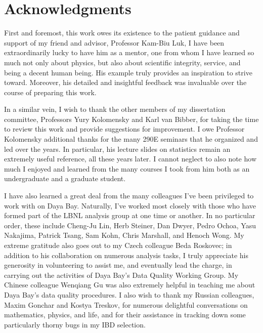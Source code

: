 \documentclass[../thesis.tex]{subfiles}
\begin{document}
\chapter*[Acknowledgments]{Acknowledgments}

First and foremost, this work owes its existence to the patient guidance and support of my friend and advisor, Professor Kam-Biu Luk, I have been extraordinarily lucky to have him as a mentor, one from whom I have learned so much not only about physics, but also about scientific integrity, service, and being a decent human being. His example truly provides an inspiration to strive toward. Moreover, his detailed and insightful feedback was invaluable over the course of preparing this work.

In a similar vein, I wish to thank the other members of my dissertation committee, Professors Yury Kolomensky and Karl van Bibber, for taking the time to review this work and provide suggestions for improvement. I owe Professor Kolomensky additional thanks for the many 290E seminars that he organized and led over the years. In particular, his lecture slides on statistics remain an extremely useful reference, all these years later. I cannot neglect to also note how much I enjoyed and learned from the many courses I took from him both as an undergraduate and a graduate student.

I have also learned a great deal from the many colleagues I've been privileged to work with on Daya Bay. Naturally, I've worked most closely with those who have formed part of the LBNL analysis group at one time or another. In no particular order, these include Cheng-Ju Lin, Herb Steiner, Dan Dwyer, Pedro Ochoa, Yasu Nakajima, Patrick Tsang, Sam Kohn, Chris Marshall, and Henoch Wong. My extreme gratitude also goes out to my Czech colleague Beda Roskovec; in addition to his collaboration on numerous analysis tasks, I truly appreciate his generosity in volunteering to assist me, and eventually lead the charge, in carrying out the activities of Daya Bay's Data Quality Working Group. My Chinese colleague Wenqiang Gu was also extremely helpful in teaching me about Daya Bay's data quality procedures. I also wish to thank my Russian colleagues, Maxim Gonchar and Kostya Treskov, for numerous delightful conversations on mathematics, physics, and life, and for their assistance in tracking down some particularly thorny bugs in my IBD selection.
\end{document}
